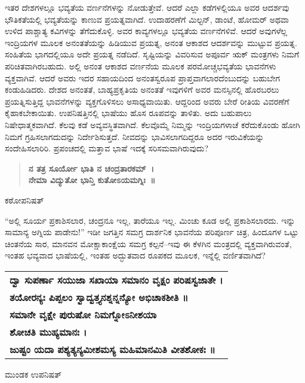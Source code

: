 ಇತರ ದೇಶಗಳಲ್ಲೂ ಭವ್ಯತೆಯ ವರ್ಣನೆಗಳನ್ನು ನೋಡುತ್ತೇವೆ. ಆದರೆ ಎಲ್ಲಾ ಕಡೆಗಳಲ್ಲಿಯೂ ಅವರ ಆದರ್ಶವು ಭೌತಿಕತೆಯಲ್ಲಿ ಭವ್ಯತೆಯನ್ನು ಕಾಣುವ ಪ್ರಯತ್ನವಾಗಿದೆ. ಉದಾಹರಣೆಗೆ ಮಿಲ್ಟನ್​, ಡಾಂಟೆ, ಹೋಮರ್​ ಅಥವಾ ಉಳಿದ ಪಾಶ್ಚಾತ್ಯ ಕವಿಗಳನ್ನು ತೆಗೆದುಕೊಳ್ಳಿ. ಅವರ ಕಾವ್ಯಗಳಲ್ಲೂ ಭವ್ಯತೆಯ ವರ್ಣನೆಗಳಿವೆ. ಆದರೆ ಅವುಗಳೆಲ್ಲ ಇಂದ್ರಿಯಗಳ ಮೂಲಕ ಅನಂತತೆಯನ್ನು ಹಿಡಿಯುವ ಪ್ರಯತ್ನ, ಅನಂತ ಆಕಾಶದ ಆದರ್ಶವನ್ನು ಮುಟ್ಟುವ ಪ್ರಯತ್ನ. ಸಂಹಿತೆಯ ಭಾಗದಲ್ಲಿಯೂ ಅದೇ ಪ್ರಯತ್ನ ನಡೆದಿದೆ. ಸೃಷ್ಟಿಯನ್ನು ವಿವರಿಸುವ ಅಪೂರ್ವ ಋಕ್​ ಮಂತ್ರಗಳು ನಿಮಗೆ ಪರಿಚಿತವಾಗಿರಬಹುದು. ಅಲ್ಲಿ ಅನಂತ ಆಕಾಶದ ವರ್ಣನೆಯ ಮೂಲಕ ಪರಮೋಚ್ಚ\break ಭವ್ಯತೆಯ ಭಾವನೆಗಳು ವ್ಯಕ್ತವಾಗಿವೆ. ಆದರೆ ಅವರು ಇದರ ಸಹಾಯದಿಂದ ಅನಂತಸ್ವರೂಪ ಪ್ರಾಪ್ತವಾಗಲಾರದೆಂಬುದನ್ನು ಬಹುಬೇಗ ಕಂಡುಹಿಡಿದರು. ದೇಶದ ಅನಂತತೆ, ಬಾಹ್ಯಪ್ರಕೃತಿಯ ಅನಂತತೆ ಇವುಗಳಿಗೆ ಅವರ ಮನಸ್ಸಿ\-ನಲ್ಲಿ ಹೊರಬರಲು ಪ್ರಯತ್ನಿಸುತ್ತಿದ್ದ ಭಾವನೆಗಳನ್ನು ವ್ಯಕ್ತಗೊಳಿಸಲು ಅಸಾಧ್ಯವಾಯಿತು. ಆದ್ದರಿಂದ ಅವರು ಬೇರೆ ರೀತಿಯ ವಿವರಣೆಗೆ ಕೈಹಾಕಬೇಕಾಯಿತು. ಉಪನಿಷತ್ತಿನಲ್ಲಿ ಭಾಷೆಯು ಹೊಸ ರೂಪವನ್ನು ತಾಳಿತು. ಅದು ಬಹುಪಾಲು ನಿಷೇಧಾತ್ಮಕವಾಗಿದೆ. ಕೆಲವು ಕಡೆ ಅವ್ಯವಸ್ಥಿತವಾಗಿದೆ. ಕೆಲವೊಮ್ಮೆ ನಿಮ್ಮನ್ನು ಇಂದ್ರಿಯಗಳಾಚೆ ಕರೆದುಕೊಂಡು ಹೋಗಿ ನಿಮಗೆ ಗ್ರಹಿಸಲಾಗದುದನ್ನು ನಿರ್ದೇಶಿಸುತ್ತದೆ. ನೀವದನ್ನು ಭಾವಿಸಲಾಗದಿದ್ದರೂ ಅದರ ಇರುವಿಕೆಯನ್ನು ಸಂದೇಹಿಸಲಾರಿರಿ. ಪ್ರಪಂಚದಲ್ಲಿ ಮತ್ತಾವ ಭಾಷೆ ಇದಕ್ಕೆ ಸರಿಸಮವಾಗಿರುವುದು?

\begin{verse}
\textbf{ನ ತತ್ರ ಸೂರ್ಯೋ ಭಾತಿ ನ ಚಂದ್ರತಾರಕಮ್​~।}\\\textbf{ನೇಮಾ ವಿದ್ಯುತೋ ಭಾನ್ತಿ ಕುತೋಽಯಮಗ್ನಿಃ~॥}
\end{verse}

\hfill ಕಠೋಪನಿಷತ್​

\vskip 5pt

“ಅಲ್ಲಿ ಸೂರ್ಯ ಪ್ರಕಾಶಿಸಲಾರ, ಚಂದ್ರನೂ ಇಲ್ಲ, ತಾರೆಯೂ ಇಲ್ಲ. ಮಿಂಚು ಕೂಡ ಅಲ್ಲಿ ಪ್ರಕಾಶಿಸಲಾರದು. ಇನ್ನು ಸಾಮಾನ್ಯ ಅಗ್ನಿಯ ಪಾಡೇನು!” ಇಡೀ ಜಗತ್ತಿನ ಸಮಗ್ರ ದಾರ್ಶನಿಕ ಭಾವನೆಯ ಪರಿಪೂರ್ಣ ಚಿತ್ರ, ಹಿಂದೂಗಳ ಒಟ್ಟು ಚಿಂತನೆಯ ಸಾರ, ಮಾನವನ ಮೋಕ್ಷಾಕಾಂಕ್ಷೆಯ ಸಮಗ್ರ ಕಲ್ಪನೆ–ಇವು ಈ ಕೆಳಗಿನ ಮಂತ್ರದಲ್ಲಿ ವ್ಯಕ್ತವಾಗಿರುವಂತೆ, ಇಂತಹ ಭವ್ಯವಾದ ಭಾಷೆಯಲ್ಲಿ, ಇಂತಹ ಅದ್ಭುತವಾದ ರೂಪಕದ ಮೂಲಕ, ಇನ್ನೆಲ್ಲಿ ವರ್ಣಿತವಾಗಿದೆ?

\begin{longtable}{@{\hspace{-18pt}}l@{}}
\textbf{ದ್ವಾ ಸುಪರ್ಣಾ ಸಯುಜಾ ಸಖಾಯಾ ಸಮಾನಂ ವೃಕ್ಷಂ ಪರಿಷಸ್ವಜಾತೇ ।} \\
\textbf{ತಯೋರನ್ಯಃ ಪಿಪ್ಪಲಂ ಸ್ವಾದ್ವತ್ತ್ಯನಶ್ನನ್ನನ್ಯೋ ಅಭಿಚಾಕಶೀತಿ ॥} \\
\textbf{ಸಮಾನೇ ವೃಕ್ಷೇ ಪುರುಷೋ ನಿಮಗ್ನೋಽನೀಶಯಾ} \\
\textbf{ಶೋಚತಿ ಮುಹ್ಯಮಾನಃ ।} \\
\textbf{ಜುಷ್ಟಂ ಯದಾ ಪಶ್ಯತ್ಯನ್ಯಮೀಶಮಸ್ಯ ಮಹಿಮಾನಮಿತಿ ವೀತಶೋಕಃ ॥} \\
\end{longtable}

\hfill ಮುಂಡಕ ಉಪನಿಷತ್​

